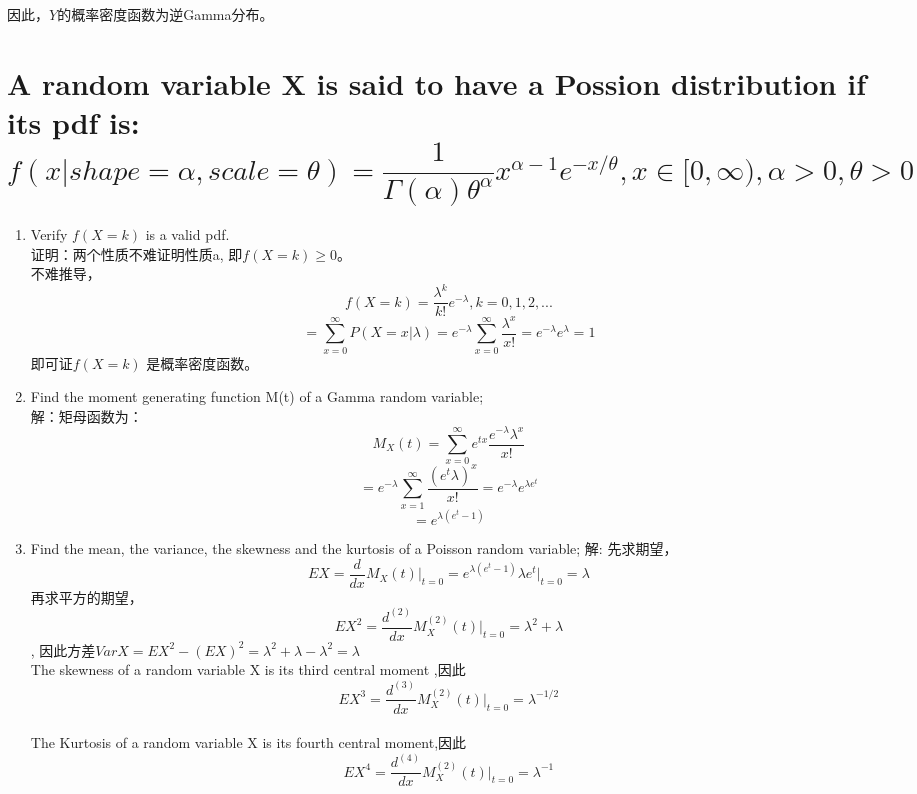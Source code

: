 \documentclass [12pt]{article}
\begin{document}
\begin{CJK*}{GBK}{kai}
\begin{enumerate}
      		因此，$Y$的概率密度函数为逆Gamma分布。
      \end{enumerate}

\section{A random variable X is said to have a Possion distribution if its pdf is: \\
     $$f(x|shape=\alpha,scale=\theta)=\frac{1}{\Gamma(\alpha)\theta^\alpha}x^{\alpha-1}e^{-x/\theta},x \in [0,\infty), \alpha >0,\theta>0$$}
\begin{enumerate}      
	\item[(a)] Verify $f(X=k)$ is a valid pdf.\\
		证明：两个性质不难证明性质a, 即$f(X=k) \ge 0$。\\
      		不难推导，$$f(X=k)=\frac{\lambda^k}{k!}e^{-\lambda},k=0,1,2,... $$
		$$= \sum_{x=0}^{\infty}P(X=x|\lambda)=e^{-\lambda}\sum_{x=0}^{\infty}\frac{\lambda^x}{x!}=e^{-\lambda} e^\lambda=1$$ 
		即可证$f(X=k)$ 是概率密度函数。
	\item[(b)] Find the moment generating function M(t) of a Gamma random variable;\\
		解：矩母函数为：
		$$M_{X}(t)= \sum_{x=0}^{\infty}e^{tx}\frac{e^{-\lambda}\lambda^x}{x!}$$
		$$=e^{-\lambda}\sum_{x=1}^{\infty}\frac{(e^t\lambda)^x}{x!}=e^{-\lambda} e^{\lambda e^t}$$
		$$=e^{\lambda(e^t-1)}$$
		
	\item[(c)]	Find the mean, the variance, the skewness and the kurtosis of a Poisson random variable;
		 解: 先求期望，$$EX=\frac{d}{dx}M_{X}(t)\vert_{t=0}=e^{\lambda(e^t-1)}\lambda e^t \vert_{t=0}=\lambda$$
		 再求平方的期望，$$EX^2=\frac{d^{(2)}}{dx}M_{X}^{(2)}(t)\vert_{t=0}=\lambda^2+\lambda$$,
		因此方差$VarX=EX^2-(EX)^2 =\lambda^2+\lambda-\lambda^2=\lambda$\\
		The skewness of a random variable X is its third central moment ,因此$$EX^3=\frac{d^{(3)}}{dx}M_{X}^{(2)}(t)\vert_{t=0}=\lambda^{-1/2}$$\\
		The Kurtosis of a random variable X is its fourth central moment,因此$$EX^4=\frac{d^{(4)}}{dx}M_{X}^{(2)}(t)\vert_{t=0}=\lambda^{-1}$$\\
  \end{enumerate}


\end{CJK*}
\end{document}
